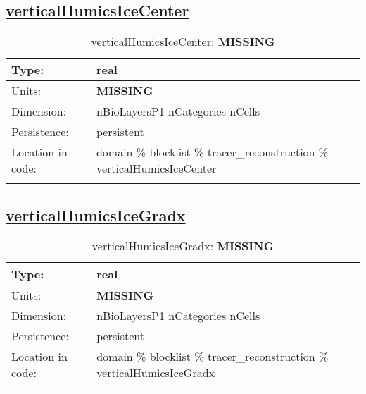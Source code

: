 \subsection[verticalHumicsIceCenter]{\hyperref[sec:var_tab_tracer_reconstruction]{verticalHumicsIceCenter}}
\label{subsec:var_sec_tracer_reconstruction_verticalHumicsIceCenter}
\begin{center}
\begin{longtable}{| p{2.0in} | p{4.0in} |}
        \hline 
        Type: & real \\
        \hline 
        Units: & {\bf \color{red} MISSING} \\
        \hline 
        Dimension: & nBioLayersP1 nCategories nCells \\
        \hline 
        Persistence: & persistent \\
        \hline 
         Location in code: & domain \% blocklist \% tracer\_reconstruction \% verticalHumicsIceCenter \\
         \hline 
    \caption{verticalHumicsIceCenter: {\bf \color{red} MISSING}}
\end{longtable}
\end{center}
\subsection[verticalHumicsIceGradx]{\hyperref[sec:var_tab_tracer_reconstruction]{verticalHumicsIceGradx}}
\label{subsec:var_sec_tracer_reconstruction_verticalHumicsIceGradx}
\begin{center}
\begin{longtable}{| p{2.0in} | p{4.0in} |}
        \hline 
        Type: & real \\
        \hline 
        Units: & {\bf \color{red} MISSING} \\
        \hline 
        Dimension: & nBioLayersP1 nCategories nCells \\
        \hline 
        Persistence: & persistent \\
        \hline 
         Location in code: & domain \% blocklist \% tracer\_reconstruction \% verticalHumicsIceGradx \\
         \hline 
    \caption{verticalHumicsIceGradx: {\bf \color{red} MISSING}}
\end{longtable}
\end{center}
